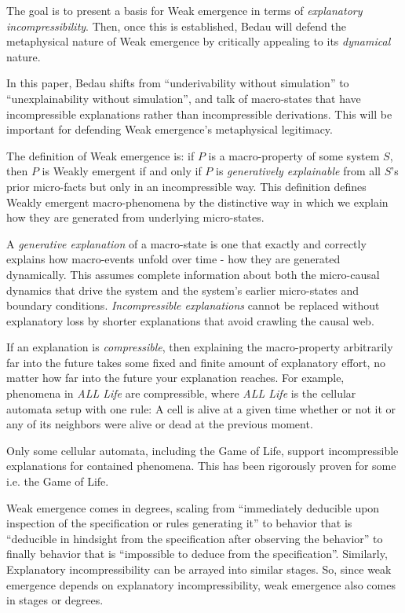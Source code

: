 \documentclass{article}
\newcommand{\ti}[1]{\textit{#1}}
\begin{document}
The goal is to present a basis for Weak emergence in terms of \ti{explanatory incompressibility}. Then, once this is established, Bedau will defend the metaphysical nature of Weak emergence by critically appealing to its \ti{dynamical} nature.

In this paper, Bedau shifts from ``underivability without simulation'' to ``unexplainability without simulation'', and talk of macro-states that have incompressible explanations rather than incompressible derivations. This will be important for defending Weak emergence's metaphysical legitimacy.

The definition of Weak emergence is: if $P$ is a macro-property of some system $S$, then $P$ is Weakly emergent if and only if $P$ is \ti{generatively explainable} from all $S$'s prior micro-facts but only in an incompressible way. This definition defines Weakly emergent macro-phenomena by the distinctive way in which we explain how they are generated from underlying micro-states.

A \ti{generative explanation} of a macro-state is one that exactly and correctly explains how macro-events unfold over time - how they are generated dynamically. This assumes complete information about both the micro-causal dynamics that drive the system and the system's earlier micro-states and boundary conditions. \ti{Incompressible explanations} cannot be replaced without explanatory loss by shorter explanations that avoid crawling the causal web.

If an explanation is \ti{compressible}, then explaining the macro-property arbitrarily far into the future takes some fixed and finite amount of explanatory effort, no matter how far into the future your explanation reaches. For example, phenomena in \ti{ALL Life} are compressible, where \ti{ALL Life} is the cellular automata setup with one rule: A cell is alive at a given time whether or not it or any of its neighbors were alive or dead at the previous moment.

Only some cellular automata, including the Game of Life, support incompressible explanations for contained phenomena. This has been rigorously proven for some i.e. the Game of Life.

Weak emergence comes in degrees, scaling from ``immediately deducible upon inspection of the specification or rules generating it'' to behavior that is ``deducible in hindsight from the specification after observing the behavior'' to finally behavior that is ``impossible to deduce from the specification''. Similarly, Explanatory incompressibility can be arrayed into similar stages. So, since weak emergence depends on explanatory incompressibility, weak emergence also comes in stages or degrees.
\end{document}
